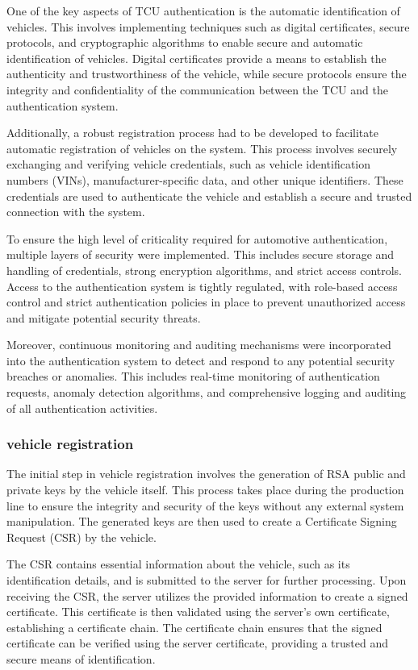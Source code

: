 \documentclass[
12pt,
oneside, 
onehalfspacing, 
nolistspacing, 
parskip, 
chapterinoneline, 
]{AASTCOMPUTER}
\begin{document}
One of the key aspects of TCU authentication is the automatic identification of vehicles. This involves implementing techniques such as digital certificates, secure protocols, and cryptographic algorithms to enable secure and automatic identification of vehicles. Digital certificates provide a means to establish the authenticity and trustworthiness of the vehicle, while secure protocols ensure the integrity and confidentiality of the communication between the TCU and the authentication system.

Additionally, a robust registration process had to be developed to facilitate automatic registration of vehicles on the system. This process involves securely exchanging and verifying vehicle credentials, such as vehicle identification numbers (VINs), manufacturer-specific data, and other unique identifiers. These credentials are used to authenticate the vehicle and establish a secure and trusted connection with the system.

To ensure the high level of criticality required for automotive authentication, multiple layers of security were implemented. This includes secure storage and handling of credentials, strong encryption algorithms, and strict access controls. Access to the authentication system is tightly regulated, with role-based access control and strict authentication policies in place to prevent unauthorized access and mitigate potential security threats.

Moreover, continuous monitoring and auditing mechanisms were incorporated into the authentication system to detect and respond to any potential security breaches or anomalies. This includes real-time monitoring of authentication requests, anomaly detection algorithms, and comprehensive logging and auditing of all authentication activities.

\subsubsection{vehicle registration}
The initial step in vehicle registration involves the generation of RSA public and private keys by the vehicle itself. This process takes place during the production line to ensure the integrity and security of the keys without any external system manipulation. The generated keys are then used to create a Certificate Signing Request (CSR) by the vehicle.

The CSR contains essential information about the vehicle, such as its identification details, and is submitted to the server for further processing. Upon receiving the CSR, the server utilizes the provided information to create a signed certificate. This certificate is then validated using the server's own certificate, establishing a certificate chain. The certificate chain ensures that the signed certificate can be verified using the server certificate, providing a trusted and secure means of identification.
\end{document}
